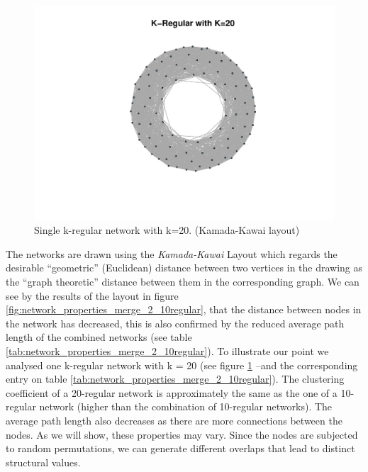\documentclass[preprint,number]{elsarticle}
\begin{document}
\begin{figure}
	\includegraphics[width=1\linewidth]{"../analysis/pdf/network_properties_1_20regular"}
	\begin{minipage}{0.7\linewidth}
		\caption{Single k-regular network with k=20. (Kamada-Kawai layout)}
		\label{fig:network_properties_1_20regular}
	\end{minipage}
\end{figure}

The networks are drawn using the \textit{Kamada-Kawai} Layout \cite{Kamada19897} which regards the desirable ``geometric'' (Euclidean) distance between two vertices in the drawing as the ``graph theoretic'' distance between them in the corresponding graph. We can see by the results of the layout in figure \ref{fig:network_properties_merge_2_10regular}, that the distance between nodes in the network has decreased, this is also confirmed by the reduced average path length of the combined networks (see table \ref{tab:network_properties_merge_2_10regular}). To illustrate our point we analysed one k-regular network with k = 20 (see figure \ref{fig:network_properties_1_20regular} --and the corresponding entry on table \ref{tab:network_properties_merge_2_10regular}). The clustering coefficient of a 20-regular network is approximately the same as the one of a 10-regular network (higher than the combination of 10-regular networks). The average path length also decreases as there are more connections between the nodes. As we will show, these properties may vary. Since the nodes are subjected to random permutations, we can generate different overlaps that lead to distinct structural values.
\end{document}
